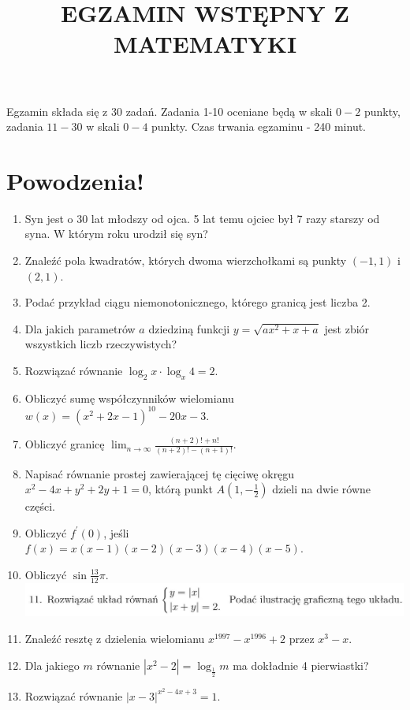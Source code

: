 \documentclass[10pt]{article}
\title{EGZAMIN WSTĘPNY Z MATEMATYKI }
\author{}
\date{}
\begin{document}
\maketitle
Egzamin składa się z 30 zadań. Zadania 1-10 oceniane będą w skali \(0-2\) punkty, zadania \(11-30\) w skali \(0-4\) punkty. Czas trwania egzaminu - 240 minut.

\section*{Powodzenia!}
\begin{enumerate}
  \item Syn jest o 30 lat młodszy od ojca. 5 lat temu ojciec był 7 razy starszy od syna. W którym roku urodził się syn?
  \item Znaleźć pola kwadratów, których dwoma wierzchołkami są punkty \((-1,1)\) i \((2,1)\).
  \item Podać przykład ciągu niemonotonicznego, którego granicą jest liczba 2.
  \item Dla jakich parametrów \(a\) dziedziną funkcji \(y=\sqrt{a x^{2}+x+a}\) jest zbiór wszystkich liczb rzeczywistych?
  \item Rozwiązać równanie \(\log _{2} x \cdot \log _{x} 4=2\).
  \item Obliczyć sumę współczynników wielomianu \(w(x)=\left(x^{2}+2 x-1\right)^{10}-20 x-3\).
  \item Obliczyć granicę \(\lim _{n \rightarrow \infty} \frac{(n+2)!+n!}{(n+2)!-(n+1)!}\).
  \item Napisać równanie prostej zawierającej tę cięciwę okręgu \(x^{2}-4 x+y^{2}+2 y+1=0\), którą punkt \(A\left(1,-\frac{1}{2}\right)\) dzieli na dwie równe części.
  \item Obliczyć \(f^{\prime}(0)\), jeśli \(f(x)=x(x-1)(x-2)(x-3)(x-4)(x-5)\).
  \item Obliczyć \(\sin \frac{13}{12} \pi\).\\
\includegraphics[max width=\textwidth, center]{2024_11_21_17fc964787b720e2b056g-1}
  \item Znaleźć resztę z dzielenia wielomianu \(x^{1997}-x^{1996}+2\) przez \(x^{3}-x\).
  \item Dla jakiego \(m\) równanie \(\left|x^{2}-2\right|=\log _{\frac{1}{2}} m\) ma dokładnie 4 pierwiastki?
  \item Rozwiązać równanie \(|x-3|^{x^{2}-4 x+3}=1\).

\end{enumerate}
\end{document}
